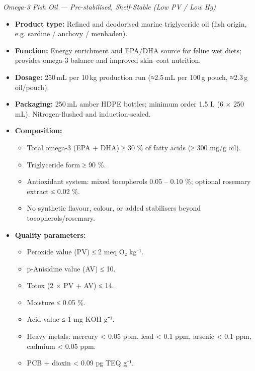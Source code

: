 
\textit{Omega-3 Fish Oil — Pre-stabilised, Shelf-Stable (Low PV / Low Hg)}

\begin{itemize}
  \item \textbf{Product type:} Refined and deodorised marine triglyceride oil (fish origin, e.g. sardine / anchovy / menhaden).

  \item \textbf{Function:} Energy enrichment and EPA/DHA source for feline wet diets; provides omega-3 balance and improved skin–coat nutrition.

  \item \textbf{Dosage:} 250\,mL per 10\,kg production run (≈2.5\,mL per 100\,g pouch, ≈2.3\,g oil/pouch).

  \item \textbf{Packaging:} 250\,mL amber HDPE bottles; minimum order 1.5 L (6 × 250 mL). Nitrogen-flushed and induction-sealed.

  \item \textbf{Composition:}
    \begin{itemize}
      \item Total omega-3 (EPA + DHA) ≥ 30 \% of fatty acids (≥ 300 mg/g oil).
      \item Triglyceride form ≥ 90 \%.
      \item Antioxidant system: mixed tocopherols 0.05 – 0.10 \%; optional rosemary extract ≤ 0.02 \%.
      \item No synthetic flavour, colour, or added stabilisers beyond tocopherols/rosemary.
    \end{itemize}

  \item \textbf{Quality parameters:}
    \begin{itemize}
      \item Peroxide value (PV) ≤ 2 meq O₂ kg⁻¹.
      \item p-Anisidine value (AV) ≤ 10.
      \item Totox (2 × PV + AV) ≤ 14.
      \item Moisture ≤ 0.05 \%.
      \item Acid value ≤ 1 mg KOH g⁻¹.
      \item Heavy metals: mercury < 0.05 ppm, lead < 0.1 ppm, arsenic < 0.1 ppm, cadmium < 0.05 ppm.
      \item PCB + dioxin < 0.09 pg TEQ g⁻¹.
    \end{itemize}


\end{itemize}
